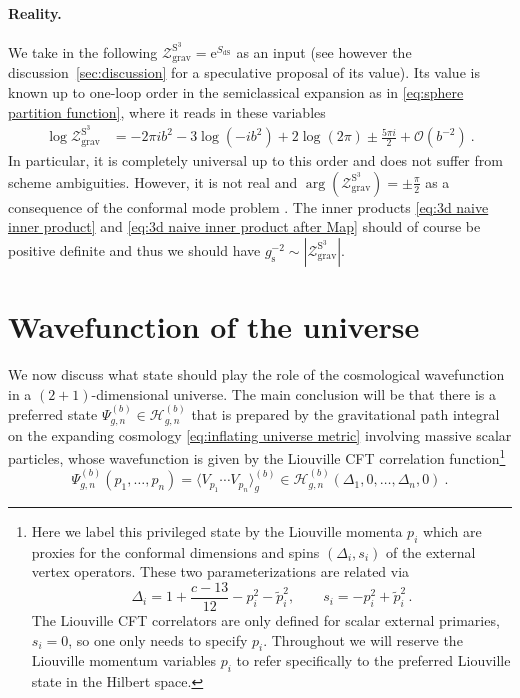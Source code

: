 \documentclass[12pt,a4paper]{article}
\newcommand{\be}{\begin{equation}}
\newcommand{\ee}{\end{equation}}
\newcommand{\e}{\mathrm{e}}
\begin{document}
\paragraph{Reality.} 
We take in the following $\mathcal{Z}^{\text{S}^3}_{\text{grav}}=\e^{S_\text{dS}}$ as an input (see however the discussion~\ref{sec:discussion} for a speculative proposal of its value). Its value is known up to one-loop order in the semiclassical expansion as in \eqref{eq:sphere partition function}, where it reads in these variables
\begin{align} 
\log \mathcal{Z}^{\text{S}^3}_{\text{grav}}
&=-2\pi i b^2-3 \log(-i b^2)+2 \log(2\pi) \pm \frac{5\pi i}{2}+ \mathcal{O}(b^{-2})~.
\end{align}
In particular, it is completely universal up to this order and does not suffer from scheme ambiguities. However, it is not real and $\arg(\mathcal{Z}^{\text{S}^3}_{\text{grav}})=\pm\frac{\pi}{2}$ as a consequence of the conformal mode problem \cite{Polchinski:1988ua}. The inner products \eqref{eq:3d naive inner product} and \eqref{eq:3d naive inner product after Map} should of course be positive definite and thus we should have $g_\text{s}^{-2} \sim |\mathcal{Z}_{\text{grav}}^{\text{S}^3}|$. 




\section{Wavefunction of the universe} \label{sec:wavefunction}
We now discuss what state should play the role of the cosmological wavefunction in a $(2{+}1)$-dimensional universe. The main conclusion will be that there is a preferred state $\Psi_{g,n}^{(b)} \in \mathcal{H}_{g,n}^{(b)}$ that is prepared by the gravitational path integral on the expanding cosmology \eqref{eq:inflating universe metric} involving massive scalar particles, whose wavefunction is given by the Liouville CFT correlation function\footnote{Here we label this privileged state by the Liouville momenta $p_i$ which are proxies for the conformal dimensions and spins $(\Delta_i,s_i)$ of the external vertex operators. These two parameterizations are related via
\begin{equation}
    \Delta_i = 1 + \frac{c-13}{12} - p_i^2 - \tilde p_i^2, \qquad s_i = -p_i^2 + \tilde p_i^2\, .
\end{equation}
The Liouville CFT correlators are only defined for scalar external primaries, $s_i = 0$, so one only needs to specify $p_i$. Throughout we will reserve the Liouville momentum variables $p_i$ to refer specifically to the preferred Liouville state in the Hilbert space.}
\be 
\Psi_{g,n}^{(b)}(p_1,\ldots,p_n)=\big\langle V_{p_1} \cdots V_{p_n} \big \rangle^{(b)}_g \in \mathcal{H}_{g,n}^{(b)}(\Delta_1,0,\ldots,\Delta_n,0)~. \label{eq:wavefunction of the universe}
\ee
\end{document}
